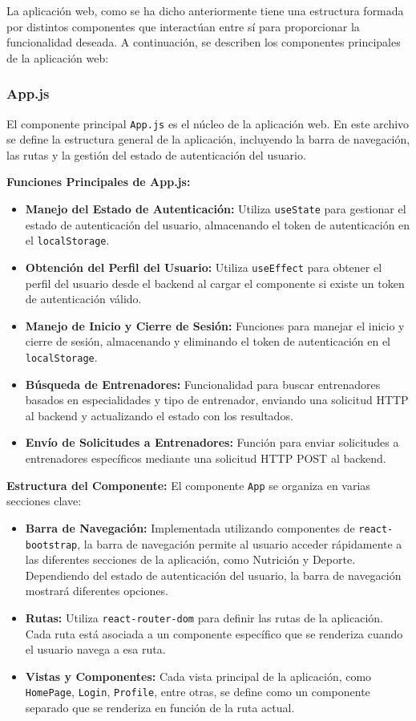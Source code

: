 La aplicación web, como se ha dicho anteriormente tiene una estructura formada por distintos componentes que interactúan entre sí para proporcionar la funcionalidad deseada. A continuación, se describen los componentes principales de la aplicación web:

\subsubsection{App.js}

El componente principal \texttt{App.js} es el núcleo de la aplicación web. En este archivo se define la estructura general de la aplicación, incluyendo la barra de navegación, las rutas y la gestión del estado de autenticación del usuario.

\textbf{Funciones Principales de App.js:}
\begin{itemize}
    \item \textbf{Manejo del Estado de Autenticación:} Utiliza \texttt{useState} para gestionar el estado de autenticación del usuario, almacenando el token de autenticación en el \texttt{localStorage}.
    \item \textbf{Obtención del Perfil del Usuario:} Utiliza \texttt{useEffect} para obtener el perfil del usuario desde el backend al cargar el componente si existe un token de autenticación válido.
    \item \textbf{Manejo de Inicio y Cierre de Sesión:} Funciones para manejar el inicio y cierre de sesión, almacenando y eliminando el token de autenticación en el \texttt{localStorage}.
    \item \textbf{Búsqueda de Entrenadores:} Funcionalidad para buscar entrenadores basados en especialidades y tipo de entrenador, enviando una solicitud HTTP al backend y actualizando el estado con los resultados.
    \item \textbf{Envío de Solicitudes a Entrenadores:} Función para enviar solicitudes a entrenadores específicos mediante una solicitud HTTP POST al backend.
\end{itemize}

\textbf{Estructura del Componente:}
El componente \texttt{App} se organiza en varias secciones clave:
\begin{itemize}
    \item \textbf{Barra de Navegación:} Implementada utilizando componentes de \texttt{react-bootstrap}, la barra de navegación permite al usuario acceder rápidamente a las diferentes secciones de la aplicación, como Nutrición y Deporte. Dependiendo del estado de autenticación del usuario, la barra de navegación mostrará diferentes opciones.
    \item \textbf{Rutas:} Utiliza \texttt{react-router-dom} para definir las rutas de la aplicación. Cada ruta está asociada a un componente específico que se renderiza cuando el usuario navega a esa ruta.
    \item \textbf{Vistas y Componentes:} Cada vista principal de la aplicación, como \texttt{HomePage}, \texttt{Login}, \texttt{Profile}, entre otras, se define como un componente separado que se renderiza en función de la ruta actual.
\end{itemize}

